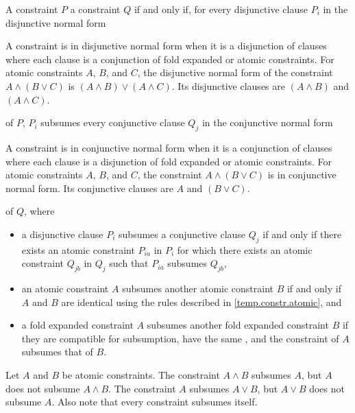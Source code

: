 \pnum
{}
A constraint $P$  a constraint $Q$
if and only if,
for every disjunctive clause $P_i$
in the disjunctive normal form
\begin{footnote}
A constraint is in disjunctive normal form when it is a disjunction of
clauses where each clause is a conjunction of fold expanded or atomic constraints.
For atomic constraints $A$, $B$, and $C$, the disjunctive normal form
of the constraint
$A \land (B \lor C)$
is
$(A \land B) \lor (A \land C)$.
%
Its disjunctive clauses are $(A \land B)$ and $(A \land C)$.
\end{footnote}
of $P$, $P_i$ subsumes every conjunctive clause $Q_j$
in the conjunctive normal form
\begin{footnote}
A constraint is in conjunctive normal form when it is a conjunction
of clauses where each clause is a disjunction of fold expanded or atomic constraints.
For atomic constraints $A$, $B$, and $C$, the constraint
$A \land (B \lor C)$ is in conjunctive normal form.
%
Its conjunctive clauses are $A$ and $(B \lor C)$.
\end{footnote}
of $Q$, where
\begin{itemize}
\item
a disjunctive clause $P_i$ subsumes a conjunctive clause $Q_j$ if and only
if there exists an atomic constraint $P_{ia}$ in $P_i$ for which there exists
an atomic constraint $Q_{jb}$ in $Q_j$ such that $P_{ia}$ subsumes $Q_{jb}$,

\item an atomic constraint $A$ subsumes another atomic constraint
$B$ if and only if $A$ and $B$ are identical using the
rules described in \ref{temp.constr.atomic}, and

\item a fold expanded constraint $A$ subsumes
another fold expanded constraint $B$
if they are compatible for subsumption,
have the same , and
the constraint of $A$ subsumes that of $B$.
\end{itemize}
%
\begin{example}
Let $A$ and $B$ be atomic constraints.
%
The constraint $A \land B$ subsumes $A$, but $A$ does not subsume $A \land B$.
%
The constraint $A$ subsumes $A \lor B$, but $A \lor B$ does not subsume $A$.
%
Also note that every constraint subsumes itself.
\end{example}

